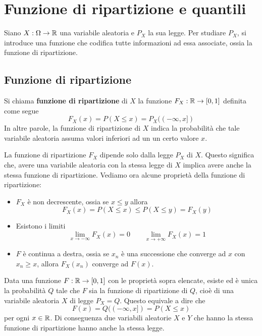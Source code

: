 \section{Funzione di ripartizione e quantili}
Siano $X : \Omega \to \mathbb{R}$ una variabile aleatoria e $P_X$ la sua legge. Per studiare $P_X$, si
introduce una funzione che codifica tutte informazioni ad essa associate, ossia la funzione di
ripartizione.

\subsection{Funzione di ripartizione}
\begin{definition}
	Si chiama \textbf{funzione di ripartizione} di $X$ la funzione $F_X : \mathbb{R} \to [0,1]$ definita
	come segue
	\[ F_X(x) = P (X \leq x) = P_X ((-\infty, x]) \]
	In altre parole, la funzione di ripartizione di $X$ indica la probabilità che tale variabile
	aleatoria assuma valori inferiori ad un un certo valore $x$.
\end{definition}

La funzione di ripartizione $F_X$ dipende solo dalla legge $P_X$ di $X$. Questo significa che,
avere una variabile aleatoria con la stessa legge di $X$ implica avere anche la stessa funzione
di ripartizione. Vediamo ora alcune proprietà della funzione di ripartizione:
\begin{itemize}
	\item $F_X$ è non decrescente, ossia se $x \leq y$ allora
	      \[ F_X(x) = P(X \leq x) \leq P(X \leq y) = F_X(y) \]
	\item Esistono i limiti
	      \[ \lim_{x \to -\infty} F_X(x) = 0 \quad \quad \lim_{x \to +\infty} F_X(x) = 1 \]
	\item $F$ è continua a destra, ossia se $x_n$ è una successione che converge ad $x$ con
	      $x_n \geq x$, allora $F_X(x_n)$ converge ad $F(x)$.
\end{itemize}

\begin{proposition}
	Data una funzione $F : \mathbb{R} \to [0,1]$ con le proprietà sopra elencate, esiste ed è unica la
	probabilità $Q$ tale che $F$ sia la funzione di ripartizione di $Q$, cioè di una variabile
	aleatoria $X$ di legge $P_X = Q$. Questo equivale a dire che
	\[ F(x) = Q((-\infty, x]) = P(X \leq x) \]
	per ogni $x \in \mathbb{R}$. Di conseguenza due variabili aleatorie $X$ e $Y$ che hanno la stessa
	funzione di ripartizione hanno anche la stessa legge.
\end{proposition}

